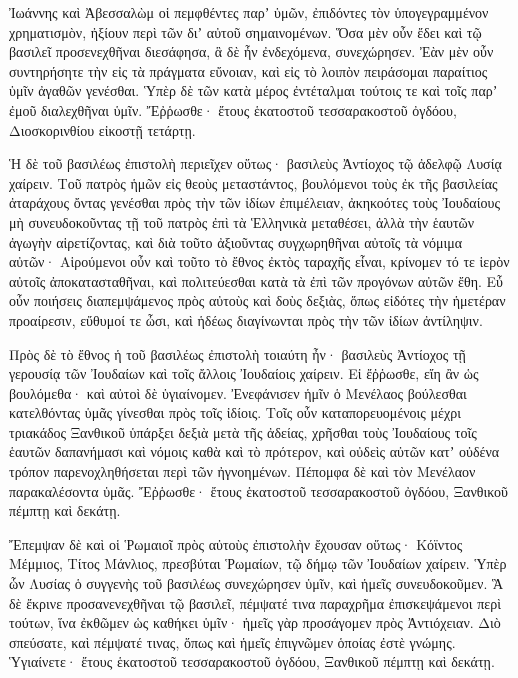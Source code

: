 {Ἰωάννης καὶ Ἀβεσσαλὼμ οἱ πεμφθέντες παρʼ ὑμῶν, ἐπιδόντες τὸν ὑπογεγραμμένον χρηματισμὸν, ἠξίουν περὶ τῶν διʼ αὐτοῦ σημαινομένων.
Ὅσα μὲν οὖν ἔδει καὶ τῷ βασιλεῖ προσενεχθῆναι διεσάφησα, ἃ δὲ ἦν ἐνδεχόμενα, συνεχώρησεν.
Ἐὰν μὲν οὖν συντηρήσητε τὴν εἰς τὰ πράγματα εὔνοιαν, καὶ εἰς τὸ λοιπὸν πειράσομαι παραίτιος ὑμῖν ἀγαθῶν γενέσθαι.
Ὑπὲρ δὲ τῶν κατὰ μέρος ἐντέταλμαι τούτοις τε καὶ τοῖς παρʼ ἐμοῦ διαλεχθῆναι ὑμῖν.
Ἔῤῥωσθε· ἔτους ἑκατοστοῦ τεσσαρακοστοῦ ὀγδόου, Διοσκορινθίου εἰκοστῇ τετάρτῃ.
\par }{\PP {}Ἡ δὲ τοῦ βασιλέως ἐπιστολὴ περιεῖχεν οὕτως· βασιλεὺς Ἀντίοχος τῷ ἀδελφῷ Λυσίᾳ χαίρειν.
Τοῦ πατρὸς ἡμῶν εἰς θεοὺς μεταστάντος, βουλόμενοι τοὺς ἐκ τῆς βασιλείας ἀταράχους ὄντας γενέσθαι πρὸς τὴν τῶν ἰδίων ἐπιμέλειαν,
ἀκηκοότες τοὺς Ἰουδαίους μὴ συνευδοκοῦντας τῇ τοῦ πατρὸς ἐπὶ τὰ Ἑλληνικὰ μεταθέσει, ἀλλὰ τὴν ἑαυτῶν ἀγωγὴν αἱρετίζοντας, καὶ διὰ τοῦτο ἀξιοῦντας συγχωρηθῆναι αὐτοῖς τὰ νόμιμα αὐτῶν·
Αἱρούμενοι οὖν καὶ τοῦτο τὸ ἔθνος ἐκτὸς ταραχῆς εἶναι, κρίνομεν τό τε ἱερὸν αὐτοῖς ἀποκατασταθῆναι, καὶ πολιτεύεσθαι κατὰ τὰ ἐπὶ τῶν προγόνων αὐτῶν ἔθη.
Εὖ οὖν ποιήσεις διαπεμψάμενος πρὸς αὐτοὺς καὶ δοὺς δεξιὰς, ὅπως εἰδότες τὴν ἡμετέραν προαίρεσιν, εὔθυμοί τε ὦσι, καὶ ἡδέως διαγίνωνται πρὸς τὴν τῶν ἰδίων ἀντίληψιν.
\par }{\PP {}Πρὸς δὲ τὸ ἔθνος ἡ τοῦ βασιλέως ἐπιστολὴ τοιαύτη ἦν· βασιλεὺς Ἀντίοχος τῇ γερουσίᾳ τῶν Ἰουδαίων καὶ τοῖς ἄλλοις Ἰουδαίοις χαίρειν.
Εἰ ἔῤῥωσθε, εἴη ἂν ὡς βουλόμεθα· καὶ αὐτοὶ δὲ ὑγιαίνομεν.
Ἐνεφάνισεν ἡμῖν ὁ Μενέλαος βούλεσθαι κατελθόντας ὑμᾶς γίνεσθαι πρὸς τοῖς ἰδίοις.
Τοῖς οὖν καταπορευομένοις μέχρι τριακάδος Ξανθικοῦ ὑπάρξει δεξιὰ μετὰ τῆς ἀδείας,
χρῆσθαι τοὺς Ἰουδαίους τοῖς ἑαυτῶν δαπανήμασι καὶ νόμοις καθὰ καὶ τὸ πρότερον, καὶ οὐδεὶς αὐτῶν κατʼ οὐδένα τρόπον παρενοχληθήσεται περὶ τῶν ἠγνοημένων.
Πέπομφα δὲ καὶ τὸν Μενέλαον παρακαλέσοντα ὑμᾶς.
Ἔῤῥωσθε· ἔτους ἑκατοστοῦ τεσσαρακοστοῦ ὀγδόου, Ξανθικοῦ πέμπτῃ καὶ δεκάτῃ.
\par }{\PP {}Ἔπεμψαν δὲ καὶ οἱ Ῥωμαιοῖ πρὸς αὐτοὺς ἐπιστολὴν ἔχουσαν οὕτως· Κόϊντος Μέμμιος, Τίτος Μάνλιος, πρεσβύται Ῥωμαίων, τῷ δήμῳ τῶν Ἰουδαίων χαίρειν.
Ὑπὲρ ὧν Λυσίας ὁ συγγενὴς τοῦ βασιλέως συνεχώρησεν ὑμῖν, καὶ ἡμεῖς συνευδοκοῦμεν.
Ἃ δὲ ἔκρινε προσανενεχθῆναι τῷ βασιλεῖ, πέμψατέ τινα παραχρῆμα ἐπισκεψάμενοι περὶ τούτων, ἵνα ἐκθῶμεν ὡς καθήκει ὑμῖν· ἡμεῖς γὰρ προσάγομεν πρὸς Ἀντιόχειαν.
Διὸ σπεύσατε, καὶ πέμψατέ τινας, ὅπως καὶ ἡμεῖς ἐπιγνῶμεν ὁποίας ἐστὲ γνώμης.
Ὑγιαίνετε· ἔτους ἑκατοστοῦ τεσσαρακοστοῦ ὀγδόου, Ξανθικοῦ πέμπτῃ καὶ δεκάτῃ.

}
